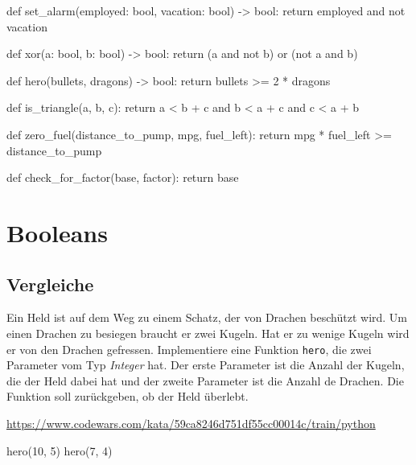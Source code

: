\documentclass[class=scrartcl, crop=false]{standalone}
\newcommand{\expandpyconc}[1]{\expandafter\reallyexpandpyconc\expandafter{#1}}
\newcommand{\reallyexpandpyconc}[1]{\pyconc{exec(compile(open('#1', 'rb').read(), '#1', 'exec'))}}
\newenvironment{pyconcodeblck}[1]
{\newcommand{\snippetfile}{snippet-#1.py}
	\VerbatimEnvironment
	\begin{VerbatimOut}{\snippetfile}}
	{\end{VerbatimOut}
	\expandpyconc{\snippetfile}}
\begin{document}
\begin{pyconcodeblck}{booleans}


def set_alarm(employed: bool, vacation: bool) -> bool:
    return employed and not vacation

def xor(a: bool, b: bool) -> bool:
    return (a and not b) or (not a and b)

def hero(bullets, dragons) -> bool:
   return bullets  >= 2 * dragons

def is_triangle(a, b, c):
    return a < b + c and b < a + c and c < a + b

def zero_fuel(distance_to_pump, mpg, fuel_left):
    return mpg * fuel_left >= distance_to_pump


def check_for_factor(base, factor):
    return base %
\end{pyconcodeblck}

\section{Booleans}


\subsection{Vergleiche}
\begin{aufgabe} \noindent
Ein Held ist auf dem Weg zu einem Schatz, der von Drachen beschützt wird. Um einen Drachen zu besiegen braucht er zwei Kugeln. Hat er zu wenige Kugeln wird er von den Drachen gefressen. Implementiere eine Funktion \texttt{hero}, die zwei Parameter vom Typ \emph{Integer} hat. Der erste Parameter ist die Anzahl der Kugeln, die der Held dabei hat und der zweite Parameter ist die Anzahl de Drachen. Die Funktion soll zurückgeben, ob der Held überlebt.

\noindent\url{https://www.codewars.com/kata/59ca8246d751df55cc00014c/train/python}\\
\end{aufgabe}

\begin{pyconsole}
hero(10, 5)
hero(7, 4)
\end{pyconsole}
\end{document}
